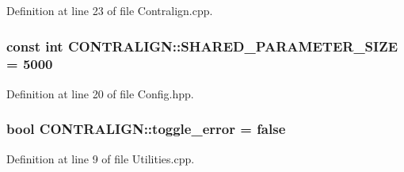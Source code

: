 Definition at line 23 of file Contralign.\+cpp.

\hypertarget{namespace_c_o_n_t_r_a_l_i_g_n_ac55874d60f48cb644c7c65c79dcb2d54}{
\subsubsection[{S\+H\+A\+R\+E\+D\+\_\+\+P\+A\+R\+A\+M\+E\+T\+E\+R\+\_\+\+S\+I\+Z\+E}]{\setlength{\rightskip}{0pt plus 5cm}const int C\+O\+N\+T\+R\+A\+L\+I\+G\+N\+::\+S\+H\+A\+R\+E\+D\+\_\+\+P\+A\+R\+A\+M\+E\+T\+E\+R\+\_\+\+S\+I\+Z\+E = 5000}}\label{namespace_c_o_n_t_r_a_l_i_g_n_ac55874d60f48cb644c7c65c79dcb2d54}


Definition at line 20 of file Config.\+hpp.

\hypertarget{namespace_c_o_n_t_r_a_l_i_g_n_ab3c518611777e6b169ba6c8f0fadfc9d}{
\subsubsection[{toggle\+\_\+error}]{\setlength{\rightskip}{0pt plus 5cm}bool C\+O\+N\+T\+R\+A\+L\+I\+G\+N\+::toggle\+\_\+error = {\bf false}}}\label{namespace_c_o_n_t_r_a_l_i_g_n_ab3c518611777e6b169ba6c8f0fadfc9d}


Definition at line 9 of file Utilities.\+cpp.

